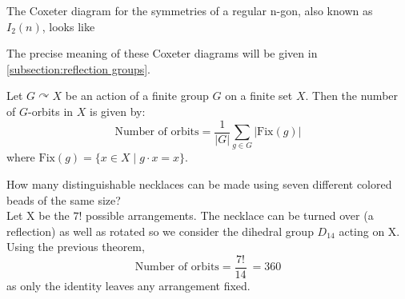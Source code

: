 \documentclass[../main.tex]{subfiles}
\begin{document}
\begin{example}
The Coxeter diagram for the symmetries of a regular n-gon, also known as $I_{2}(n)$, looks like
    \begin{figure}[H]
    \centering

\end{figure}

The precise meaning of these Coxeter diagrams will be given in \ref{subsection:reflection groups}.

\end{example}


\begin{theorem}
\label{}
Let \( G \curvearrowright X \) be an action of a finite group \( G \) on a finite set \( X \).  
Then the number of \( G \)-orbits in \( X \) is given by:
\[
\text{Number of orbits} = \frac{1}{|G|} \sum_{g \in G} |\mathrm{Fix}(g)|
\]
where \( \mathrm{Fix}(g) = \{ x \in X \mid g \cdot x = x \} \).
\end{theorem}

\begin{example}\cite{fraleigh}
How many distinguishable necklaces can be made using seven different colored beads of the same size?\\
    Let X be the $7!$ possible arrangements. The necklace can be turned over (a reflection) as well as rotated so we consider the dihedral group $D_{14}$ acting on X. Using the previous theorem, 
\[
\text{Number of orbits} = \frac{7!}{14}\ = 360
\]
as only the identity leaves any arrangement fixed.
\end{example}
\end{document}
